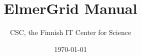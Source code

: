 \documentclass[a4paper,english]{report}    %
\title{\Huge{\bf ElmerGrid Manual}}
\author{CSC, the Finnish IT Center for Science}
\date{\today}
\begin{document}
\maketitle






\setcounter{secnumdepth}{2}
\setcounter{tocdepth}{1}  %

\tableofcontents


\newpage
\pagestyle{fancy}


\graphicspath{{./}{figures/}}


\graphicspath{{./}{figures/}}


\graphicspath{{./}{figures/}}


\graphicspath{{./}{tool/}}


\graphicspath{{./}{import/}}






\printindex
\end{document}
